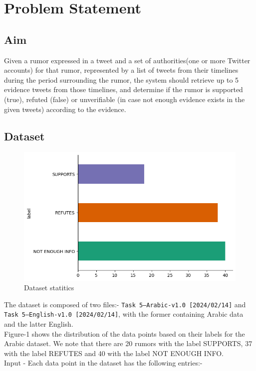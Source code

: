 \documentclass[conference]{IEEEtran}
\begin{document}
\section{Problem Statement}
\subsection{Aim}
Given a rumor expressed in a tweet and a set of authorities(one or more Twitter accounts) for that rumor, represented by a list of tweets from their timelines during the period surrounding the rumor, the system should retrieve up to 5 evidence tweets from those timelines, and determine if the rumor is supported (true), refuted (false) or unverifiable (in case not enough evidence exists in the given tweets) according to the evidence. \cite{problem-statement}
\subsection{Dataset}
\begin{figure}[htp]
    \centering
    \includegraphics[width=\columnwidth]{images/dataser.png}
    \caption{Dataset statitics}
    \label{fig:es}
\end{figure} 
The dataset is composed of two files:- \texttt{Task 5--Arabic-v1.0 [2024/02/14]} and \texttt{Task 5--English-v1.0 [2024/02/14]}, with the former containing Arabic data and the latter English.\cite{input_data} \\
Figure-1 shows the distribution of the data points based on their labels for the Arabic dataset. We note that there are 20 rumors with the label SUPPORTS, 37 with the label REFUTES and 40 with the label NOT ENOUGH INFO.\\
Input - Each data point in the dataset has the following entries:-
\end{document}
